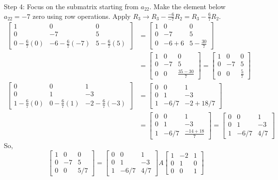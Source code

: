 \documentclass{article}
\begin{document}
Step 4: Focus on the submatrix starting from $a_{22}$. Make the element below $a_{22}=-7$ zero using row operations.
Apply $R_3 \to R_3 - \frac{-6}{-7}R_2 = R_3 - \frac{6}{7}R_2$.
\begin{align*} \begin{bmatrix} 1 & 0 & 0 \\ 0 & -7 & 5 \\ 0 - \frac{6}{7}(0) & -6 - \frac{6}{7}(-7) & 5 - \frac{6}{7}(5) \end{bmatrix} &= \begin{bmatrix} 1 & 0 & 0 \\ 0 & -7 & 5 \\ 0 & -6 + 6 & 5 - \frac{30}{7} \end{bmatrix} \\ &= \begin{bmatrix} 1 & 0 & 0 \\ 0 & -7 & 5 \\ 0 & 0 & \frac{35-30}{7} \end{bmatrix} = \begin{bmatrix} 1 & 0 & 0 \\ 0 & -7 & 5 \\ 0 & 0 & \frac{5}{7} \end{bmatrix} \\ \begin{bmatrix} 0 & 0 & 1 \\ 0 & 1 & -3 \\ 1 - \frac{6}{7}(0) & 0 - \frac{6}{7}(1) & -2 - \frac{6}{7}(-3) \end{bmatrix} &= \begin{bmatrix} 0 & 0 & 1 \\ 0 & 1 & -3 \\ 1 & -6/7 & -2 + 18/7 \end{bmatrix} \\ &= \begin{bmatrix} 0 & 0 & 1 \\ 0 & 1 & -3 \\ 1 & -6/7 & \frac{-14+18}{7} \end{bmatrix} = \begin{bmatrix} 0 & 0 & 1 \\ 0 & 1 & -3 \\ 1 & -6/7 & 4/7 \end{bmatrix}\end{align*}
So,
\[ \begin{bmatrix} 1 & 0 & 0 \\ 0 & -7 & 5 \\ 0 & 0 & 5/7 \end{bmatrix} = \begin{bmatrix} 0 & 0 & 1 \\ 0 & 1 & -3 \\ 1 & -6/7 & 4/7 \end{bmatrix} A \begin{bmatrix} 1 & -2 & 1 \\ 0 & 1 & 0 \\ 0 & 0 & 1 \end{bmatrix} \]
\end{document}
